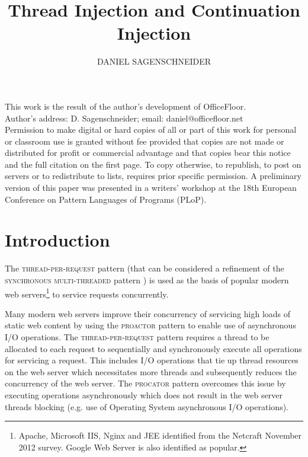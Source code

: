 \documentclass[prodmode]{style/acmlarge}
\title{Thread Injection and Continuation Injection}
\author{DANIEL SAGENSCHNEIDER \affil{daniel@officefloor.net}}
\begin{document}
\graphicspath{{./pdf/}}

\lstset{language=Java}

\captionsetup[lstlisting]{font=footnotesize}


\begin{bottomstuff}
This work is the result of the author's development of OfficeFloor.\\
Author's address: D. Sagenschneider; email: daniel@officefloor.net\\

Permission to make digital or hard copies of all or part of this work for
personal or classroom use is granted without fee provided that copies are not
made or distributed for profit or commercial advantage and that copies bear this
notice and the full citation on the first page. To copy otherwise, to republish,
to post on servers or to redistribute to lists, requires prior specific
permission. A preliminary version of this paper was presented in a writers'
workshop at the 18th European Conference on Pattern Languages of Programs
(PLoP).
\end{bottomstuff}

\maketitle



\section{Introduction}

The \textsc{thread-per-request} pattern \cite{thread-per-request} (that can be
considered a refinement of the \textsc{synchronous multi-threaded} pattern
\cite{proactor}) is used as the basis of popular modern web
servers\footnote{Apache, Microsoft IIS, Nginx and JEE identified from the
Netcraft November 2012 survey.  Google Web Server is also identified as
popular.} to service requests concurrently.

Many modern web servers improve their concurrency of servicing high loads of
static web content by using the \textsc{proactor} pattern \cite{proactor} to
enable use of asynchronous I/O operations.  The \textsc{thread-per-request}
pattern requires a thread to be allocated to each request to sequentially and
synchronously execute all operations for servicing a request.  This includes I/O
operations that tie up thread resources on the web server which necessitates
more threads and subsequently reduces the concurrency of the web server.  The
\textsc{procator} pattern overcomes this issue by executing operations
asynchronously which does not result in the web server threads blocking (e.g.
use of Operating System asynchronous I/O operations).
\end{document}
